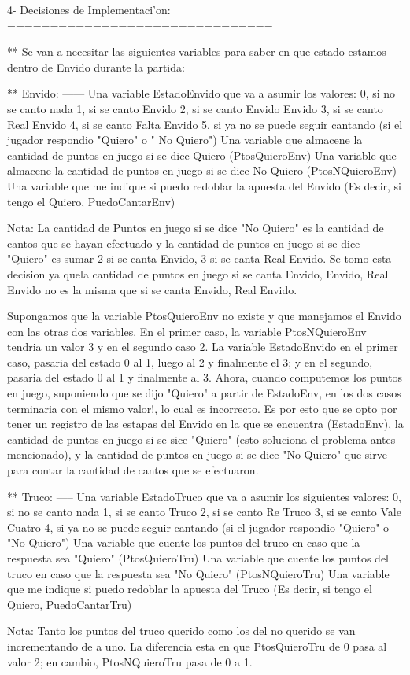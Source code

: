4- Decisiones de Implementaci'on:
===============================

** Se van a necesitar las siguientes variables para saber en que estado estamos dentro de Envido durante la
partida:

** Envido:
   ------
  Una variable EstadoEnvido que va a asumir los valores:
    0, si no se canto nada
    1, si se canto Envido
    2, si se canto Envido Envido
    3, si se canto Real Envido
    4, si se canto Falta Envido
    5, si ya no se puede seguir cantando (si el jugador respondio "Quiero" o " No Quiero")
  Una variable que almacene la cantidad de puntos en juego si se dice Quiero (PtosQuieroEnv)
  Una variable que almacene la cantidad de puntos en juego si se dice No Quiero (PtosNQuieroEnv)
  Una variable que me indique si puedo redoblar la apuesta del Envido (Es decir, si tengo el Quiero, PuedoCantarEnv)

Nota:
  La cantidad de Puntos en juego si se dice "No Quiero" es la cantidad de cantos que se hayan efectuado y la cantidad
de puntos en juego si se dice "Quiero" es sumar 2 si se canta Envido, 3 si se canta Real Envido. Se tomo esta decision ya quela cantidad de puntos en juego si se canta Envido, Envido, Real Envido no es la misma que si se canta Envido, Real Envido.

  Supongamos que la variable PtosQuieroEnv no existe y que manejamos el Envido con las otras dos variables. En el primer caso, la variable PtosNQuieroEnv tendria un valor 3 y en el segundo caso 2. La variable EstadoEnvido en el primer caso, pasaria del estado 0 al 1, luego al 2 y finalmente el 3; y en el segundo, pasaria del estado 0 al 1 y finalmente al 3. Ahora, cuando computemos los puntos en juego, suponiendo que se dijo "Quiero" a partir de EstadoEnv, en los dos casos terminaria con el mismo valor!, lo cual es incorrecto. Es por esto que se opto por tener un registro de las estapas del Envido en la que se encuentra (EstadoEnv), la cantidad de puntos en juego si se sice "Quiero" (esto soluciona el problema antes mencionado), y la cantidad de puntos en juego si se dice "No Quiero" que sirve para contar la cantidad de cantos que se efectuaron.

** Truco:
   -----
  Una variable EstadoTruco que va a asumir los siguientes valores:
    0, si no se canto nada
    1, si se canto Truco
    2, si se canto Re Truco
    3, si se canto Vale Cuatro
    4, si ya no se puede seguir cantando (si el jugador respondio "Quiero" o "No Quiero")
  Una variable que cuente los puntos del truco en caso que la respuesta sea "Quiero" (PtosQuieroTru)
  Una variable que cuente los puntos del truco en caso que la respuesta sea "No Quiero" (PtosNQuieroTru)
  Una variable que me indique si puedo redoblar la apuesta del Truco (Es decir, si tengo el Quiero, PuedoCantarTru)

Nota:
  Tanto los puntos del truco querido como los del no querido se van incrementando de a uno. La diferencia esta en que PtosQuieroTru de 0 pasa al valor 2; en cambio, PtosNQuieroTru pasa de 0 a 1.
